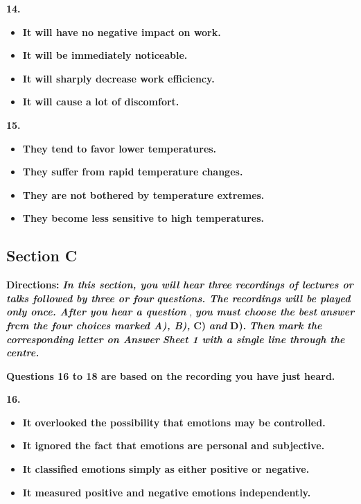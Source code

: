 \documentclass[UTF8,11pt]{ctexart}
\begin{document}
\textbf{14.}


\begin{itemize}[leftmargin=2em,itemsep=.2em,topsep=.4em]\item[A.] \textbf{It will have no negative impact on work.}
\item[B.] \textbf{It will be immediately noticeable.}
\item[C.] \textbf{It will sharply decrease work efficiency.}
\item[D.] \textbf{It will cause a lot of discomfort.}
\end{itemize}

\textbf{15.}


\begin{itemize}[leftmargin=2em,itemsep=.2em,topsep=.4em]\item[A.] \textbf{They tend to favor lower temperatures.}
\item[B.] \textbf{They suffer from rapid temperature changes.}
\item[C.] \textbf{They are not bothered by temperature extremes.}
\item[D.] \textbf{They become less sensitive to high temperatures.}
\end{itemize}

\subsection*{\textbf{Section C}}


\textbf{Directions: }\textbf{\textit{In this section, you will hear three recordings of lectures or talks followed by three or four}} \textbf{\textit{questions. The recordings will be played only once. After you hear a question }}, \textbf{\textit{you must choose the best}} \textbf{\textit{answer frcm the four choices marked A), B), }}\textbf{C) }\textbf{\textit{and }}\textbf{D). }\textbf{\textit{Then mark the corresponding letter on Answer}} \textbf{\textit{Sheet 1 with a single line through the centre.}}


\textbf{Questions 16 to 18 are based on the recording you have just heard.}


\textbf{16.}


\begin{itemize}[leftmargin=2em,itemsep=.2em,topsep=.4em]\item[A.] \textbf{It overlooked the possibility that emotions may be controlled.}
\item[B.] \textbf{It ignored the fact that emotions are personal and subjective.}
\item[C.] \textbf{It classified emotions simply as either positive or negative.}
\item[D.] \textbf{It measured positive and negative emotions independently.}
\end{itemize}
\end{document}
